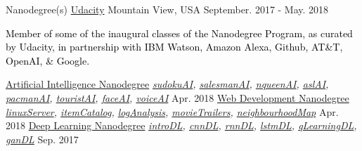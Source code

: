

\begin{cventries}


	\cventry
	{Nanodegree(s)} %
	{\href{https://www.udacity.com/}{Udacity}} %
	{Mountain View, USA} %
	{September. 2017 - May. 2018} %
	{\textcolor{black}{Member of some of the inaugural classes of the Nanodegree Program, as curated by Udacity, in partnership with IBM Watson, Amazon Alexa, Github, AT\&T, OpenAI, \& Google.}
		\begin{cvhonors}
			\cvhonor
			{\href{https://confirm.udacity.com/HJZHVDJH}{Artificial Intelligence Nanodegree}} %
			{\textit{
					\href{https://github.com/Vvkmnn/sudokuAI}{sudokuAI},
					\href{https://github.com/Vvkmnn/salesmanAI}{salesmanAI},
					\href{https://github.com/Vvkmnn/nqueenAI}{nqueenAI},
					\href{https://github.com/Vvkmnn/aslAI}{aslAI},
					\href{https://github.com/Vvkmnn/pacmanAI}{pacmanAI},
					\href{https://github.com/Vvkmnn/touristAI}{touristAI},
					\href{https://github.com/Vvkmnn/faceAI}{faceAI},
					\href{https://github.com/Vvkmnn/voiceAI}{voiceAI}
				}
			} %
			{} %
			{Apr. 2018} %
			\cvhonor
			{\href{https://confirm.udacity.com/GTSYRMGY}{Web Development Nanodegree}} %
			{ \textit{
					\href{https://github.com/Vvkmnn/linuxServer}{linuxServer}, \href{https://github.com/Vvkmnn/itemCatalog}{itemCatalog}, \href{https://github.com/Vvkmnn/logAnalysis}{logAnalysis}, \href{https://github.com/Vvkmnn/movieTrailers}{movieTrailers},
					\href{https://github.com/Vvkmnn/neighbourhoodMap}{neighbourhoodMap}
				}
			} %
			{} %
			{Apr. 2018} %
			\cvhonor
			{\href{https://confirm.udacity.com/XXZTHYHT}{Deep Learning Nanodegree}} %
			{\textit{
					\href{https://github.com/Vvkmnn/introDL}{introDL},
					\href{https://github.com/Vvkmnn/cnnDL}{cnnDL},
					\href{https://github.com/Vvkmnn/rnnDL}{rnnDL},
					\href{https://github.com/Vvkmnn/lstmDL}{lstmDL},
					\href{https://github.com/Vvkmnn/qLearningDL}{qLearningDL},
					\href{https://github.com/Vvkmnn/ganD}{ganDL}
				}
			} %
			{} %
			{Sep. 2017} %
		\end{cvhonors}
		\newline\newline\newline
	}




\end{cventries}
